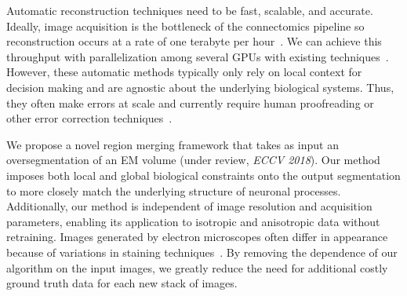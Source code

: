 Automatic reconstruction techniques need to be fast, scalable, and accurate.
Ideally, image acquisition is the bottleneck of the connectomics pipeline so reconstruction occurs at a rate of one terabyte per hour~\cite{haehn2017scalable}.
We can achieve this throughput with parallelization among several GPUs with existing techniques~\cite{funke2017deep,parag2017anisotropic}.
However, these automatic methods typically only rely on local context for decision making and are agnostic about the underlying biological systems.
Thus, they often make errors at scale and currently require human proofreading or other error correction techniques~\cite{haehn2017guided,error_correction_using_CNN}. 

We propose a novel region merging framework that takes as input an oversegmentation of an EM volume (under review, \textit{ECCV 2018}).
Our method imposes both local and global biological constraints onto the output segmentation to more closely match the underlying structure of neuronal processes.
Additionally, our method is independent of image resolution and acquisition parameters, enabling its application to isotropic and anisotropic data without retraining.
Images generated by electron microscopes often differ in appearance because of variations in staining techniques~\cite{briggman2012volume}.
By removing the dependence of our algorithm on the input images, we greatly reduce the need for additional costly ground truth data for each new stack of images.
